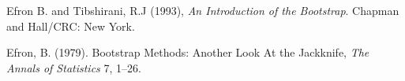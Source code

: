 \begin{thebibliography}{}



Efron B. and Tibshirani, R.J (1993), {\it An Introduction of the
  Bootstrap}. Chapman and  Hall/CRC: New York.

Efron, B. (1979). Bootstrap Methods: Another Look At the Jackknife,
       {\it The Annals of Statistics} 7, 1--26.
\end{thebibliography}
